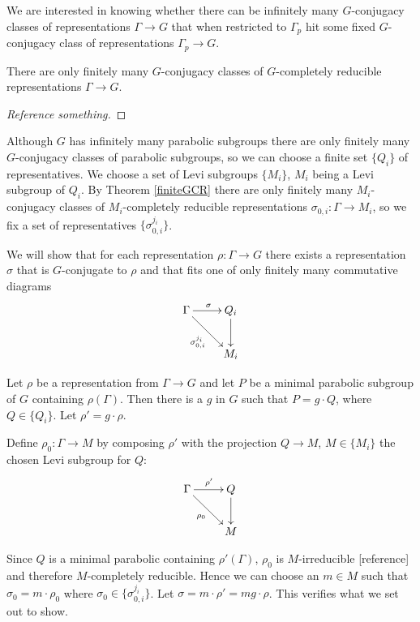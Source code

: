 We are interested in knowing whether there can be infinitely many $G$-conjugacy classes of representations $\Gamma\rightarrow G$ that when restricted to $\Gamma_p$ hit some fixed $G$-conjugacy class of representations $\Gamma_p\rightarrow G$. 

\begin{theorem} \label{finiteGCR} There are only finitely many $G$-conjugacy classes of $G$-completely reducible representations $\Gamma\rightarrow G$.
\end{theorem}
\begin{proof}[Reference something]
\end{proof}

Although $G$ has infinitely many parabolic subgroups there are only finitely many $G$-conjugacy classes of parabolic subgroups, so we can choose a finite set $\{Q_i\}$ of representatives. We choose a set of Levi subgroups $\{M_i\}$, $M_i$ being a Levi subgroup of $Q_i$. By Theorem \ref{finiteGCR} there are only finitely many $M_i$-conjugacy classes of $M_i$-completely reducible representations $\sigma_{0, i}:\Gamma\rightarrow M_i$, so we fix a set of representatives $\{\sigma^{j_i}_{0,i}\}$.

We will show that for each representation $\rho:\Gamma\rightarrow G$ there exists a representation $\sigma$ that is $G$-conjugate to $\rho$ and that fits one of only finitely many commutative diagrams
\begin{displaymath}
	\xymatrix{
	\Gamma \ar[r]^{\sigma} \ar[rd]_{\sigma^{j_i}_{0,i}} & Q_i \ar[d]\\
	& M_i}
\end{displaymath}

Let $\rho$ be a representation from $\Gamma\rightarrow G$ and let $P$ be a minimal parabolic subgroup of $G$ containing $\rho(\Gamma)$. Then there is a $g$ in $G$ such that $P = g\cdot Q$, where $Q\in\{Q_i\}$. Let $\rho' = g\cdot \rho$. 

Define $\rho_0:\Gamma\rightarrow M$ by composing $\rho'$ with the projection $Q\rightarrow M$, $M\in\{M_i\}$ the chosen Levi subgroup for $Q$:
\begin{displaymath}
	\xymatrix{
	\Gamma \ar[r]^{\rho'} \ar[rd]_{\rho_0} & Q \ar[d]\\
	& M}
\end{displaymath}

Since $Q$ is a minimal parabolic containing $\rho'(\Gamma)$, $\rho_0$ is $M$-irreducible [reference] and therefore $M$-completely reducible. Hence we can choose an $m\in M$ such that $\sigma_0 = m\cdot \rho_0$ where $\sigma_0\in\{\sigma^{j_i}_{0,i}\}$. Let $\sigma = m\cdot \rho' = mg\cdot \rho$. This verifies what we set out to show.

